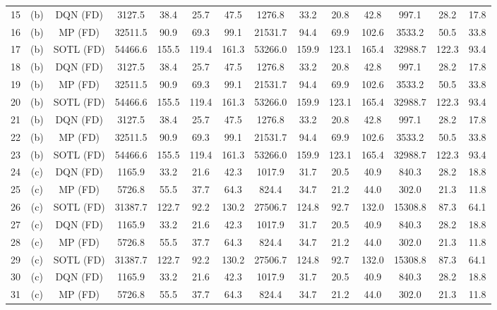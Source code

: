 \begin{table}[htbp]
\begin{tabular}{|c|c|c|c|c|c|c|c|c|c|c|c|c|c|}
15 &  (b) &   DQN (FD) &  3127.5 &  38.4 &  25.7 &  47.5 &  1276.8 &  33.2 &  20.8 &  42.8 &   997.1 &  28.2 & 17.8 \\
16 &  (b) &    MP (FD) & 32511.5 &  90.9 &  69.3 &  99.1 & 21531.7 &  94.4 &  69.9 & 102.6 &  3533.2 &  50.5 & 33.8 \\
17 &  (b) &  SOTL (FD) & 54466.6 & 155.5 & 119.4 & 161.3 & 53266.0 & 159.9 & 123.1 & 165.4 & 32988.7 & 122.3 & 93.4 \\
18 &  (b) &   DQN (FD) &  3127.5 &  38.4 &  25.7 &  47.5 &  1276.8 &  33.2 &  20.8 &  42.8 &   997.1 &  28.2 & 17.8 \\
19 &  (b) &    MP (FD) & 32511.5 &  90.9 &  69.3 &  99.1 & 21531.7 &  94.4 &  69.9 & 102.6 &  3533.2 &  50.5 & 33.8 \\
20 &  (b) &  SOTL (FD) & 54466.6 & 155.5 & 119.4 & 161.3 & 53266.0 & 159.9 & 123.1 & 165.4 & 32988.7 & 122.3 & 93.4 \\
21 &  (b) &   DQN (FD) &  3127.5 &  38.4 &  25.7 &  47.5 &  1276.8 &  33.2 &  20.8 &  42.8 &   997.1 &  28.2 & 17.8 \\
22 &  (b) &    MP (FD) & 32511.5 &  90.9 &  69.3 &  99.1 & 21531.7 &  94.4 &  69.9 & 102.6 &  3533.2 &  50.5 & 33.8 \\
23 &  (b) &  SOTL (FD) & 54466.6 & 155.5 & 119.4 & 161.3 & 53266.0 & 159.9 & 123.1 & 165.4 & 32988.7 & 122.3 & 93.4 \\
24 &  (c) &   DQN (FD) &  1165.9 &  33.2 &  21.6 &  42.3 &  1017.9 &  31.7 &  20.5 &  40.9 &   840.3 &  28.2 & 18.8 \\
25 &  (c) &    MP (FD) &  5726.8 &  55.5 &  37.7 &  64.3 &   824.4 &  34.7 &  21.2 &  44.0 &   302.0 &  21.3 & 11.8 \\
26 &  (c) &  SOTL (FD) & 31387.7 & 122.7 &  92.2 & 130.2 & 27506.7 & 124.8 &  92.7 & 132.0 & 15308.8 &  87.3 & 64.1 \\
27 &  (c) &   DQN (FD) &  1165.9 &  33.2 &  21.6 &  42.3 &  1017.9 &  31.7 &  20.5 &  40.9 &   840.3 &  28.2 & 18.8 \\
28 &  (c) &    MP (FD) &  5726.8 &  55.5 &  37.7 &  64.3 &   824.4 &  34.7 &  21.2 &  44.0 &   302.0 &  21.3 & 11.8 \\
29 &  (c) &  SOTL (FD) & 31387.7 & 122.7 &  92.2 & 130.2 & 27506.7 & 124.8 &  92.7 & 132.0 & 15308.8 &  87.3 & 64.1 \\
30 &  (c) &   DQN (FD) &  1165.9 &  33.2 &  21.6 &  42.3 &  1017.9 &  31.7 &  20.5 &  40.9 &   840.3 &  28.2 & 18.8 \\
31 &  (c) &    MP (FD) &  5726.8 &  55.5 &  37.7 &  64.3 &   824.4 &  34.7 &  21.2 &  44.0 &   302.0 &  21.3 & 11.8 \\

\end{tabular}
\end{table}
